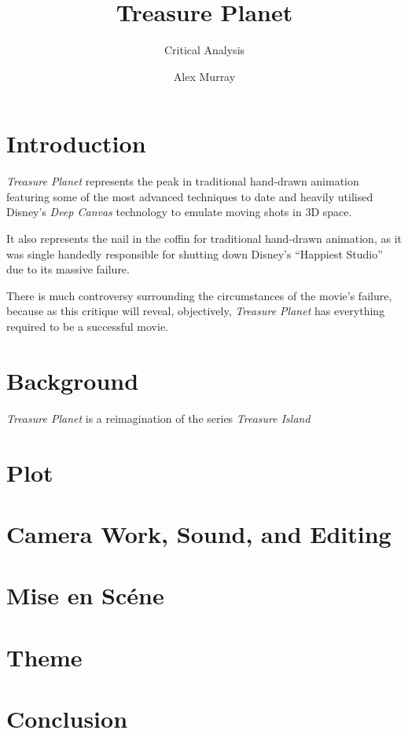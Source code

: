 \documentclass{fhnwreport}
\title{Treasure Planet}
\subtitle{Critical Analysis}
\author{Alex Murray}
\begin{document}
\maketitle
\tableofcontents
\newpage

\begin{multicols}{2}

\section{Introduction}

\textit{Treasure  Planet}   represents  the  peak  in  traditional  hand-drawn
animation featuring some of the most advanced techniques to  date  and heavily
utilised  Disney's \textit{Deep Canvas} technology to emulate moving shots  in
3D space.

It  also  represents  the  nail  in  the  coffin  for  traditional  hand-drawn
animation, as it was  single  handedly  responsible for shutting down Disney's
``Happiest Studio'' due to its massive failure.

There is  much  controversy  surrounding  the  circumstances  of  the  movie's
failure, because as  this  critique will reveal, objectively, \textit{Treasure
Planet} has everything required to be a successful movie.

\section{Background}

\textit{Treasure Planet} is a reimagination of the series \textit{Treasure Island}

\section{Plot}

\section{Camera Work, Sound, and Editing}

\section{Mise en Sc\'ene}

\section{Theme}

\section{Conclusion}

\printbibliography

\end{multicols}
\end{document}

